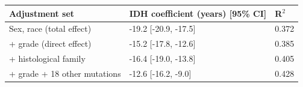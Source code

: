 \begin{tabular}{lll}
\toprule
\textbf{Adjustment set} & \textbf{IDH coefficient (years) [95\% CI]} & \textbf{R$^2$} \\
\midrule
Sex, race (total effect) & -19.2 [-20.9, -17.5] & 0.372 \\
+ grade (direct effect) & -15.2 [-17.8, -12.6] & 0.385 \\
+ histological family & -16.4 [-19.0, -13.8] & 0.405 \\
+ grade + 18 other mutations & -12.6 [-16.2, -9.0] & 0.428 \\
\bottomrule
\end{tabular}
